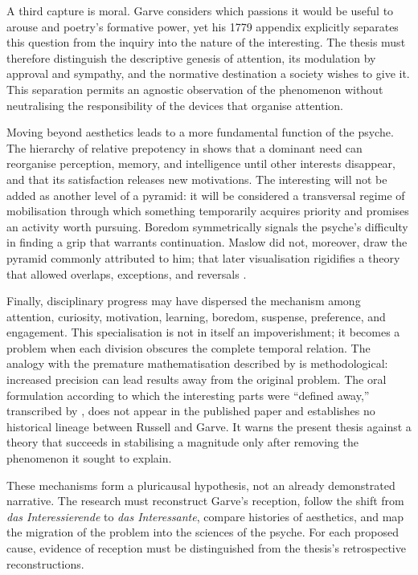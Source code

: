\documentclass[11pt,a4paper]{article}
\begin{document}
A third capture is moral. Garve considers which passions it would be useful to
arouse and poetry's formative power, yet his 1779 appendix explicitly separates
this question from the inquiry into the nature of the interesting. The thesis
must therefore distinguish the descriptive genesis of attention, its modulation
by approval and sympathy, and the normative destination a society wishes to give
it. This separation permits an agnostic observation of the phenomenon without
neutralising the responsibility of the devices that organise attention.

Moving beyond aesthetics leads to a more fundamental function of the psyche.
The hierarchy of relative prepotency in \textcite{maslow1943motivation} shows
that a dominant need can reorganise perception, memory, and intelligence until
other interests disappear, and that its satisfaction releases new motivations.
The interesting will not be added as another level of a pyramid: it will be
considered a transversal regime of mobilisation through which something
temporarily acquires priority and promises an activity worth pursuing. Boredom
symmetrically signals the psyche's difficulty in finding a grip that warrants
continuation. Maslow did not, moreover, draw the pyramid commonly attributed to
him; that later visualisation rigidifies a theory that allowed overlaps,
exceptions, and reversals \parencite{bridgman2019maslow}.

Finally, disciplinary progress may have dispersed the mechanism among attention,
curiosity, motivation, learning, boredom, suspense, preference, and engagement.
This specialisation is not in itself an impoverishment; it becomes a problem
when each division obscures the complete temporal relation. The analogy with
the premature mathematisation described by \textcite{russell1995rationality} is
methodological: increased precision can lead results away from the original
problem. The oral formulation according to which the interesting parts were
``defined away,'' transcribed by \textcite{pachet1997representation}, does not
appear in the published paper and establishes no historical lineage between
Russell and Garve. It warns the present thesis against a theory that succeeds in
stabilising a magnitude only after removing the phenomenon it sought to explain.

These mechanisms form a pluricausal hypothesis, not an already demonstrated
narrative. The research must reconstruct Garve's reception, follow the shift
from \emph{das Interessierende} to \emph{das Interessante}, compare histories of
aesthetics, and map the migration of the problem into the sciences of the
psyche. For each proposed cause, evidence of reception must be distinguished
from the thesis's retrospective reconstructions.
\end{document}
